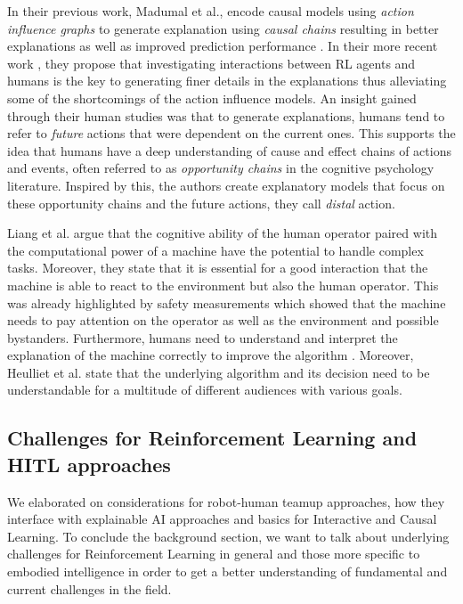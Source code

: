 \documentclass[twoside,11pt]{article}
\begin{document}
In their previous work, Madumal et al., encode causal models using \emph{action influence graphs} to generate explanation using \emph{causal chains} resulting in better explanations as well as improved prediction performance \cite{MadumalEtAl:2020:CausalRLCFs}. In their more recent work \cite{Madumal:2020:DistalEF}, they propose that investigating interactions between RL agents and humans is the key to generating finer details in the explanations thus alleviating some of the shortcomings of the action influence models. An insight gained through their human studies was that to generate explanations, humans tend to refer to \emph{future} actions that were dependent on the current ones. This supports the idea that humans have a deep understanding of cause and effect chains of actions and events, often referred to as \emph{opportunity chains} in the cognitive psychology literature. Inspired by this, the authors create explanatory models that focus on these opportunity chains and the future actions, they call \emph{distal} action. 

Liang et al. \cite{LiangEtAl:2017:HITLReinforcementLearn} argue that the cognitive ability of the human operator paired with the computational power of a machine have the potential to handle complex tasks. Moreover, they state that it is essential for a good interaction that the machine is able to react to the environment but also the human operator. This was already highlighted by safety measurements which showed that the machine needs to pay attention on the operator as well as the environment and possible bystanders. Furthermore, humans need to understand and interpret the explanation of the machine correctly to improve the algorithm \cite{heuillet2021explainability}. Moreover, Heulliet et al. \cite{heuillet2021explainability} state that the underlying algorithm and its decision need to be understandable for a multitude of different audiences with various goals.

\subsection{Challenges for Reinforcement Learning and HITL approaches}

We elaborated on considerations for robot-human teamup approaches, how they interface with explainable AI approaches and basics for Interactive and Causal Learning. To conclude the background section, we want to talk about underlying challenges for Reinforcement Learning in general and those more specific to embodied intelligence in order to get a better understanding of fundamental and current challenges in the field.
\end{document}
